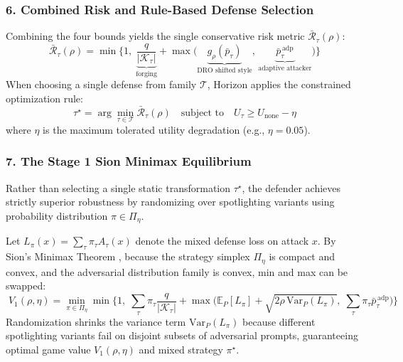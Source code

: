 \subsubsection{6. Combined Risk and Rule-Based Defense Selection}
Combining the four bounds yields the single conservative risk metric $\bar{\mathcal{R}}_\tau(\rho)$:
\begin{equation}
    \bar{\mathcal{R}}_\tau(\rho) = \min\Bigg\{1,\; \underbrace{\frac{q}{|\mathcal{K}_\tau|}}_{\text{forging}} + \max\Big(\underbrace{g_\rho(\bar{p}_\tau)}_{\text{DRO shifted style}},\, \underbrace{\bar{p}^{\,\mathrm{adp}}_\tau}_{\text{adaptive attacker}}\Big)\Bigg\}
\end{equation}
When choosing a single defense from family $\mathcal{T}$, Horizon applies the constrained optimization rule:
\begin{equation}
    \tau^\star = \arg\min_{\tau \in \mathcal{T}} \bar{\mathcal{R}}_\tau(\rho) \quad \text{subject to} \quad U_\tau \ge U_{\mathrm{none}} - \eta
\end{equation}
where $\eta$ is the maximum tolerated utility degradation (e.g., $\eta = 0.05$).

\subsubsection{7. The Stage 1 Sion Minimax Equilibrium}
Rather than selecting a single static transformation $\tau^\star$, the defender achieves strictly superior robustness by randomizing over spotlighting variants using probability distribution $\pi \in \Pi_\eta$. 

Let $L_\pi(x) = \sum_\tau \pi_\tau A_\tau(x)$ denote the mixed defense loss on attack $x$. By Sion's Minimax Theorem \cite{sion1958minimax}, because the strategy simplex $\Pi_\eta$ is compact and convex, and the adversarial distribution family is convex, min and max can be swapped:
\begin{equation}
    \boxed{\;
    V_1(\rho, \eta) = \min_{\pi \in \Pi_\eta} \min\Bigg\{1,\;
    \sum_\tau \pi_\tau \frac{q}{|\mathcal{K}_\tau|}
    + \max\Big(
    \mathbb{E}_P[L_\pi] + \sqrt{2\rho\,\mathrm{Var}_P(L_\pi)},\;
    \sum_\tau \pi_\tau \bar{p}^{\,\mathrm{adp}}_\tau
    \Big)\Bigg\}\;}
\end{equation}
Randomization shrinks the variance term $\mathrm{Var}_P(L_\pi)$ because different spotlighting variants fail on disjoint subsets of adversarial prompts, guaranteeing optimal game value $V_1(\rho, \eta)$ and mixed strategy $\pi^\star$.

